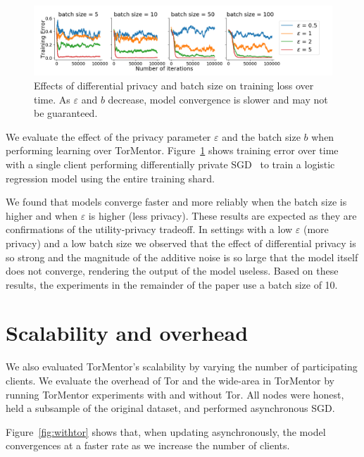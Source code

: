 \begin{figure}[t]
	\includegraphics[width=\textwidth]{fig/giantplot}
	\caption{Effects of differential privacy and batch size on training
		loss over time. As $\varepsilon$ and $b$ decrease, model convergence
		is slower and may not be guaranteed.}
	\label{fig:bs50}
\end{figure}

We evaluate the effect of the privacy parameter $\varepsilon$ and the
batch size $b$ when performing learning over TorMentor. 
Figure~\ref{fig:bs50} shows training error over time with a single
client performing differentially private SGD~\cite{Song:2013} to
train a logistic regression model using the entire training shard.

We found that models converge faster and more reliably when the batch
size is higher and when $\varepsilon$ is higher (less privacy). These
results are expected as they are confirmations of the utility-privacy
tradeoff. In settings with a low $\varepsilon$ (more privacy) and a low
batch size we observed that the effect of differential privacy is so
strong and the magnitude of the additive noise is so large that the
model itself does not converge, rendering the output of the model
useless. Based on these results, the experiments in the remainder of the
paper use a batch size of 10.


\section{Scalability and overhead}
\label{eval:overhead}

We also evaluated TorMentor's scalability by varying the number of
participating clients. We evaluate the overhead of Tor and the
wide-area in TorMentor by running TorMentor experiments with and
without Tor. All nodes were honest, held a subsample of the original
dataset, and performed asynchronous SGD.

Figure~\ref{fig:withtor} shows that, when updating asynchronously, the
model convergences at a faster rate as we increase the number of
clients.

